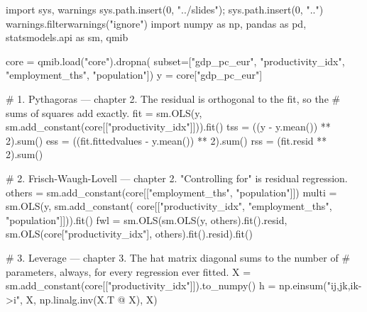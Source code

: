 \documentclass[
  letterpaper,
  10pt,
  twoside,
  openright,
  numbers=noenddot,
  chapterprefix=true]{scrbook}
\newenvironment{Shaded}{}{}
\newcommand{\BuiltInTok}[1]{\textcolor[rgb]{0.84,0.23,0.29}{#1}}
\newcommand{\CommentTok}[1]{\textcolor[rgb]{0.42,0.45,0.49}{#1}}
\newcommand{\DecValTok}[1]{\textcolor[rgb]{0.00,0.36,0.77}{#1}}
\newcommand{\ImportTok}[1]{\textcolor[rgb]{0.01,0.18,0.38}{#1}}
\newcommand{\NormalTok}[1]{\textcolor[rgb]{0.14,0.16,0.18}{#1}}
\newcommand{\OperatorTok}[1]{\textcolor[rgb]{0.14,0.16,0.18}{#1}}
\newcommand{\StringTok}[1]{\textcolor[rgb]{0.01,0.18,0.38}{#1}}
\begin{document}
\label{check-closing}
\begin{Shaded}
\begin{Highlighting}[]
\ImportTok{import}\NormalTok{ sys, warnings}
\NormalTok{sys.path.insert(}\DecValTok{0}\NormalTok{, }\StringTok{"../slides"}\NormalTok{)}\OperatorTok{;}\NormalTok{ sys.path.insert(}\DecValTok{0}\NormalTok{, }\StringTok{".."}\NormalTok{)}
\NormalTok{warnings.filterwarnings(}\StringTok{"ignore"}\NormalTok{)}
\ImportTok{import}\NormalTok{ numpy }\ImportTok{as}\NormalTok{ np, pandas }\ImportTok{as}\NormalTok{ pd, statsmodels.api }\ImportTok{as}\NormalTok{ sm, qmib}

\NormalTok{core }\OperatorTok{=}\NormalTok{ qmib.load(}\StringTok{"core"}\NormalTok{).dropna(}
\NormalTok{    subset}\OperatorTok{=}\NormalTok{[}\StringTok{"gdp\_pc\_eur"}\NormalTok{, }\StringTok{"productivity\_idx"}\NormalTok{, }\StringTok{"employment\_ths"}\NormalTok{, }\StringTok{"population"}\NormalTok{])}
\NormalTok{y }\OperatorTok{=}\NormalTok{ core[}\StringTok{"gdp\_pc\_eur"}\NormalTok{]}

\CommentTok{\# 1. Pythagoras — chapter 2. The residual is orthogonal to the fit, so the}
\CommentTok{\#    sums of squares add exactly.}
\NormalTok{fit }\OperatorTok{=}\NormalTok{ sm.OLS(y, sm.add\_constant(core[[}\StringTok{"productivity\_idx"}\NormalTok{]])).fit()}
\NormalTok{tss }\OperatorTok{=}\NormalTok{ ((y }\OperatorTok{{-}}\NormalTok{ y.mean()) }\OperatorTok{**} \DecValTok{2}\NormalTok{).}\BuiltInTok{sum}\NormalTok{()}
\NormalTok{ess }\OperatorTok{=}\NormalTok{ ((fit.fittedvalues }\OperatorTok{{-}}\NormalTok{ y.mean()) }\OperatorTok{**} \DecValTok{2}\NormalTok{).}\BuiltInTok{sum}\NormalTok{()}
\NormalTok{rss }\OperatorTok{=}\NormalTok{ (fit.resid }\OperatorTok{**} \DecValTok{2}\NormalTok{).}\BuiltInTok{sum}\NormalTok{()}

\CommentTok{\# 2. Frisch{-}Waugh{-}Lovell — chapter 2. "Controlling for" is residual regression.}
\NormalTok{others }\OperatorTok{=}\NormalTok{ sm.add\_constant(core[[}\StringTok{"employment\_ths"}\NormalTok{, }\StringTok{"population"}\NormalTok{]])}
\NormalTok{multi }\OperatorTok{=}\NormalTok{ sm.OLS(y, sm.add\_constant(}
\NormalTok{    core[[}\StringTok{"productivity\_idx"}\NormalTok{, }\StringTok{"employment\_ths"}\NormalTok{, }\StringTok{"population"}\NormalTok{]])).fit()}
\NormalTok{fwl }\OperatorTok{=}\NormalTok{ sm.OLS(sm.OLS(y, others).fit().resid,}
\NormalTok{             sm.OLS(core[}\StringTok{"productivity\_idx"}\NormalTok{], others).fit().resid).fit()}

\CommentTok{\# 3. Leverage — chapter 3. The hat matrix diagonal sums to the number of}
\CommentTok{\#    parameters, always, for every regression ever fitted.}
\NormalTok{X }\OperatorTok{=}\NormalTok{ sm.add\_constant(core[[}\StringTok{"productivity\_idx"}\NormalTok{]]).to\_numpy()}
\NormalTok{h }\OperatorTok{=}\NormalTok{ np.einsum(}\StringTok{"ij,jk,ik{-}\textgreater{}i"}\NormalTok{, X, np.linalg.inv(X.T }\OperatorTok{@}\NormalTok{ X), X)}


\end{Highlighting}
\end{Shaded}
\end{document}
